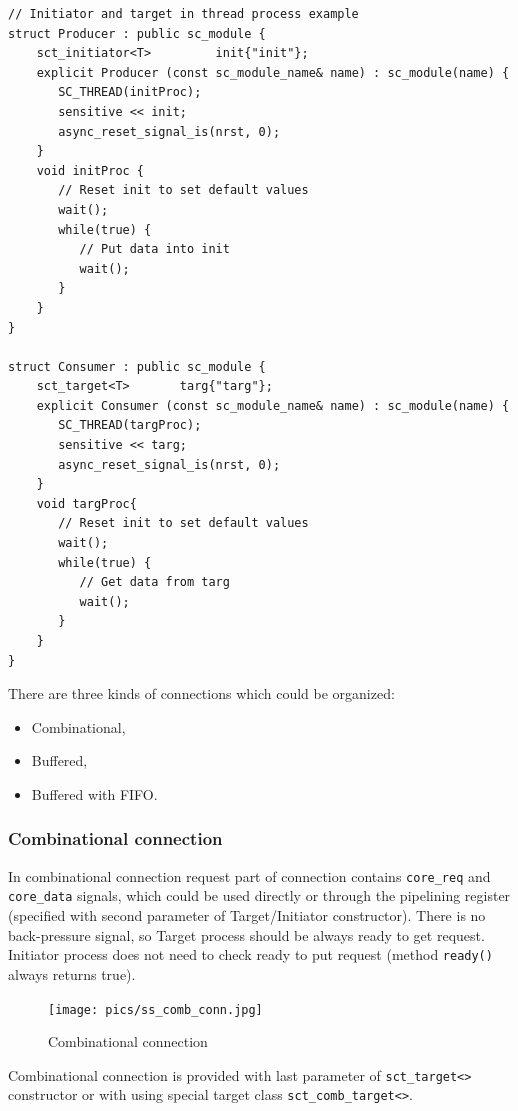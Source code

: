 \begin{lstlisting}[style=mycpp]
// Initiator and target in thread process example
struct Producer : public sc_module {
    sct_initiator<T>         init{"init"};
    explicit Producer (const sc_module_name& name) : sc_module(name) {
       SC_THREAD(initProc); 
       sensitive << init;
       async_reset_signal_is(nrst, 0);
    } 
    void initProc {
       // Reset init to set default values
       wait();
       while(true) {
          // Put data into init 
          wait();
       }
    }
}

struct Consumer : public sc_module {
    sct_target<T>       targ{"targ"};   
    explicit Consumer (const sc_module_name& name) : sc_module(name) {
       SC_THREAD(targProc); 
       sensitive << targ;
       async_reset_signal_is(nrst, 0);
    } 
    void targProc{
       // Reset init to set default values
       wait();
       while(true) {
          // Get data from targ
          wait();
       }
    }
}
\end{lstlisting}

There are three kinds of connections which could be organized:
\begin{itemize}
\item Combinational,
\item Buffered,
\item Buffered with FIFO.
\end{itemize}

\subsubsection{Combinational connection}

In combinational connection request part of connection contains {\tt core\_req} and {\tt core\_data} signals, which could be used directly or through the pipelining register (specified with second parameter of Target/Initiator constructor). There is no back-pressure signal, so Target process should be always ready to get request. Initiator process does not need to check ready to put request (method {\tt ready()} always returns true).

\begin{figure}[!htb]
\centering
\texttt{[image: pics/ss\_comb\_conn.jpg]}
\caption{Combinational connection}
\label{fig:ss_usage}
\end{figure}

Combinational connection is provided with last parameter of {\tt sct\_target<>} constructor or with using special target class {\tt sct\_comb\_target<>}.

